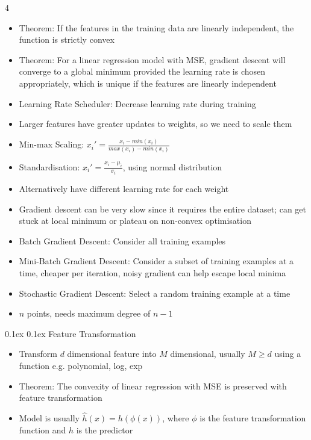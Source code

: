 \documentclass[10pt, landscape]{article}
\makeatletter
\renewcommand{\subsection}{\@startsection{subsection}{2}{0mm}%
  {0.1ex} %
  {0.1ex} %
  {\normalfont\normalsize\bfseries}}
\makeatother
\begin{document}
\begin{multicols*}{4}
\begin{itemize}
    \item Theorem: If the features in the training data are linearly independent, the function is strictly convex
    \item Theorem: For a linear regression model with MSE, gradient descent will converge to a global minimum provided the learning rate is chosen appropriately, which is unique if the features are linearly independent
    \item Learning Rate Scheduler: Decrease learning rate during training
    \item Larger features have greater updates to weights, so we need to scale them
    \item Min-max Scaling: $x_i'=\frac{x_i-min(x_i)}{max(x_i)-min(x_i)}$
    \item Standardisation: $x_i'=\frac{x_i-\mu_i}{\sigma_i}$, using normal distribution
    \item Alternatively have different learning rate for each weight
    \item Gradient descent can be very slow since it requires the entire dataset; can get stuck at local minimum or plateau on non-convex optimisation
    \item Batch Gradient Descent: Consider all training examples
    \item Mini-Batch Gradient Descent: Consider a subset of training examples at a time, cheaper per iteration, noisy gradient can help escape local minima
    \item Stochastic Gradient Descent: Select a random training example at a time
    \item $n$ points, needs maximum degree of $n-1$
\end{itemize}

\subsection{Feature Transformation}
\begin{itemize}
    \item Transform $d$ dimensional feature into $M$ dimensional, usually $M \geq d$ using a function e.g. polynomial, log, exp
    \item Theorem: The convexity of linear regression with MSE is preserved with feature transformation
    \item Model is usually $\hat{h}(x)=h(\phi(x))$, where $\phi$ is the feature transformation function and $h$ is the predictor
\end{itemize}


\end{multicols*}
\end{document}
